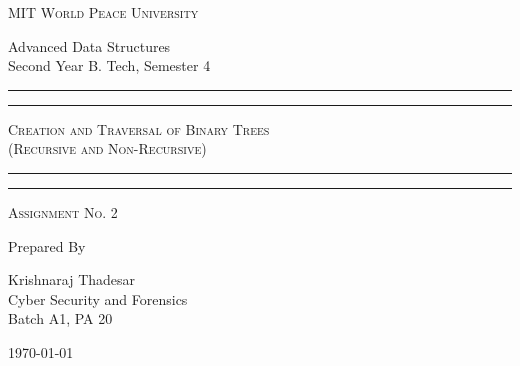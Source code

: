 \documentclass[11pt]{article}
\begin{document}
\begin{titlepage}
	\centering


	\huge\textsc{
		MIT World Peace University
	}\\

	\vspace{0.75\baselineskip} %

	\LARGE{
		Advanced Data Structures\\
		Second Year B. Tech, Semester 4
	}

	\vfill %


	\rule{\textwidth}{1.6pt}\vspace*{-\baselineskip}\vspace*{2pt}
	\rule{\textwidth}{0.6pt}
	\vspace{0.75\baselineskip} %



	\huge{\textsc{
			Creation and Traversal of Binary Trees\\
            (Recursive and Non-Recursive)
		}} \\



	\vspace{0.5\baselineskip} %
	\rule{\textwidth}{0.6pt}\vspace*{-\baselineskip}\vspace*{2.8pt}
	\rule{\textwidth}{1.6pt}

	\vspace{1\baselineskip} %


	\LARGE\textsc{
		Assignment No. 2
	} %
	\vfill


	Prepared By
	\vspace{0.5\baselineskip} %

	\Large{
		Krishnaraj Thadesar \\
		Cyber Security and Forensics\\
		Batch A1, PA 20
	}


	\vspace{0.5\baselineskip} %
	\today

\end{titlepage}
\end{document}
